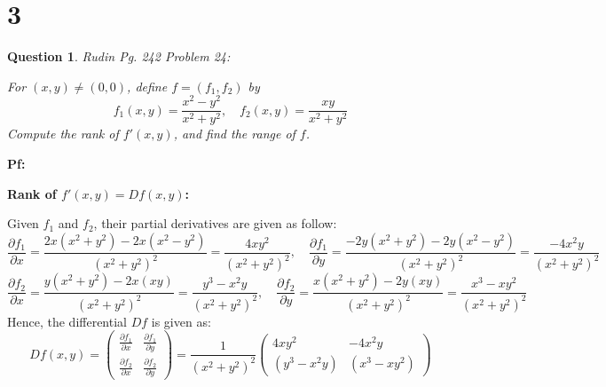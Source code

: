 \documentclass{article}
\newtheorem{question}{Question}
\begin{document}
\break

\section*{3}
\begin{myBox}[]{}
    \begin{question}
        Rudin Pg. 242 Problem 24:

        For $(x,y)\neq (0,0)$, define $f=(f_1,f_2)$ by 
        $$f_1(x,y)=\frac{x^2-y^2}{x^2+y^2},\quad f_2(x,y)=\frac{xy}{x^2+y^2}$$
        Compute the rank of $f'(x,y)$, and find the range of $f$.
    \end{question}
\end{myBox}

\textbf{Pf:}

\textbf{Rank of $f'(x,y)=Df(x,y)$:}

Given $f_1$ and $f_2$, their partial derivatives are given as follow:
$$\frac{\partial f_1}{\partial x} = \frac{2x(x^2+y^2)-2x(x^2-y^2)}{(x^2+y^2)^2} = \frac{4xy^2}{(x^2+y^2)^2},\quad \frac{\partial f_1}{\partial y}=\frac{-2y(x^2+y^2)-2y(x^2-y^2)}{(x^2+y^2)^2}=\frac{-4x^2y}{(x^2+y^2)^2}$$
$$\frac{\partial f_2}{\partial x}=\frac{y(x^2+y^2)-2x(xy)}{(x^2+y^2)^2}=\frac{y^3-x^2y}{(x^2+y^2)^2},\quad \frac{\partial f_2}{\partial y}=\frac{x(x^2+y^2)-2y(xy)}{(x^2+y^2)^2}=\frac{x^3-xy^2}{(x^2+y^2)^2}$$
Hence, the differential $Df$ is given as:
$$Df(x,y)=\begin{pmatrix}
    \frac{\partial f_1}{\partial x} & \frac{\partial f_1}{\partial y}\\
    \frac{\partial f_2}{\partial x} & \frac{\partial f_2}{\partial y}
\end{pmatrix}=\frac{1}{(x^2+y^2)^2}\begin{pmatrix}
    4xy^2 & -4x^2y\\
    (y^3-x^2y) & (x^3-xy^2)
\end{pmatrix}$$
\end{document}
